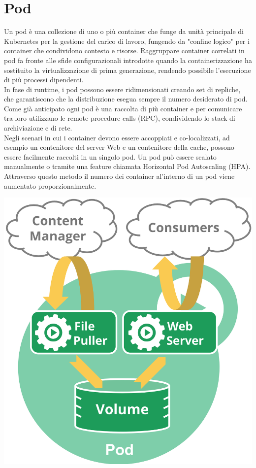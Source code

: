 \documentclass[12pt, a4paper]{report}
\begin{document}
\section{Pod}
Un pod è una collezione di uno o più container che funge da unità principale di Kubernetes per la gestione del carico di lavoro, fungendo da "confine logico" per i container che condividono contesto e risorse. Raggruppare container correlati in pod fa fronte alle sfide configurazionali introdotte quando la containerizzazione ha sostituito la virtualizzazione di prima generazione, rendendo possibile l'esecuzione di più processi dipendenti.\\In fase di runtime, i pod possono essere ridimensionati creando set di repliche, che garantiscono che la distribuzione esegua sempre il numero desiderato di pod. Come già anticipato ogni pod è una raccolta di più container e per comunicare tra loro utilizzano le remote procedure calls (RPC), condividendo lo stack di archiviazione e di rete.\\
Negli scenari in cui i container devono essere accoppiati e co-localizzati, ad esempio un contenitore del server Web e un contenitore della cache, possono essere facilmente raccolti in un singolo pod. Un pod può essere scalato manualmente o tramite una feature chiamata Horizontal Pod Autoscaling (HPA).\\
Attraverso questo metodo il numero dei container al'interno di un pod viene aumentato proporzionalmente.
\begin{center}
  \includegraphics[scale=0.4]{Images/Kubernetes-pod}
\end{center}
\end{document}

